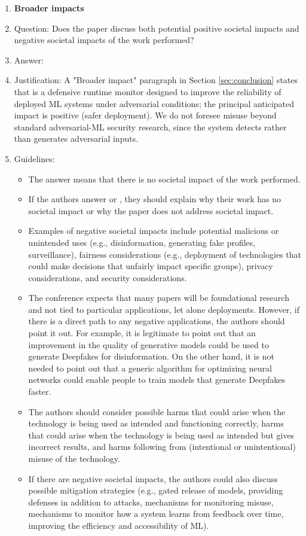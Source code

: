 \begin{enumerate}
\item {\bf Broader impacts}
    \item[] Question: Does the paper discuss both potential positive societal impacts and negative societal impacts of the work performed?
    \item[] Answer: \answerYes{}
    \item[] Justification: A "Broader impact" paragraph in Section \ref{sec:conclusion} states that \prism is a defensive runtime monitor designed to improve the reliability of deployed ML systems under adversarial conditions; the principal anticipated impact is positive (safer deployment). We do not foresee misuse beyond standard adversarial-ML security research, since the system detects rather than generates adversarial inputs.
    \item[] Guidelines:
    \begin{itemize}
        \item The answer \answerNA{} means that there is no societal impact of the work performed.
        \item If the authors answer \answerNA{} or \answerNo, they should explain why their work has no societal impact or why the paper does not address societal impact.
        \item Examples of negative societal impacts include potential malicious or unintended uses (e.g., disinformation, generating fake profiles, surveillance), fairness considerations (e.g., deployment of technologies that could make decisions that unfairly impact specific groups), privacy considerations, and security considerations.
        \item The conference expects that many papers will be foundational research and not tied to particular applications, let alone deployments. However, if there is a direct path to any negative applications, the authors should point it out. For example, it is legitimate to point out that an improvement in the quality of generative models could be used to generate Deepfakes for disinformation. On the other hand, it is not needed to point out that a generic algorithm for optimizing neural networks could enable people to train models that generate Deepfakes faster.
        \item The authors should consider possible harms that could arise when the technology is being used as intended and functioning correctly, harms that could arise when the technology is being used as intended but gives incorrect results, and harms following from (intentional or unintentional) misuse of the technology.
        \item If there are negative societal impacts, the authors could also discuss possible mitigation strategies (e.g., gated release of models, providing defenses in addition to attacks, mechanisms for monitoring misuse, mechanisms to monitor how a system learns from feedback over time, improving the efficiency and accessibility of ML).
    \end{itemize}
    

\end{enumerate}

